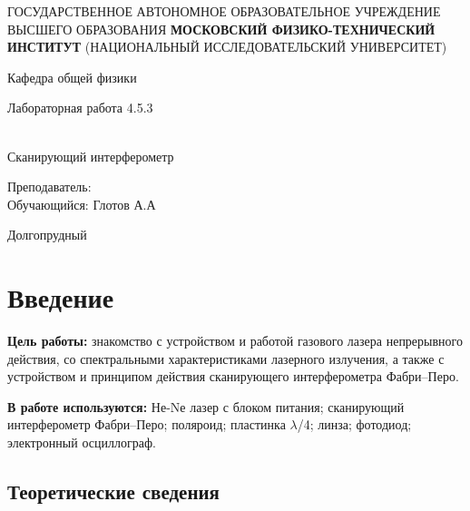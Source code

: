 \documentclass[12pt,a4paper]{article}
\author{Глотов Алексей}
\begin{document}
\newpage
\begin{center}
\footnotesize{{ГОСУДАРСТВЕННОЕ АВТОНОМНОЕ ОБРАЗОВАТЕЛЬНОЕ УЧРЕЖДЕНИЕ}\break
{ВЫСШЕГО ОБРАЗОВАНИЯ}
\break
{\bf {МОСКОВСКИЙ ФИЗИКО-ТЕХНИЧЕСКИЙ ИНСТИТУТ}}
\break
\small{(НАЦИОНАЛЬНЫЙ ИССЛЕДОВАТЕЛЬСКИЙ УНИВЕРСИТЕТ)}}
\break
\hfill \break
\hfill \break
\begin{center}
\normalsize{Кафедра общей физики}
\end{center}
\hfill \break
\hfill \break
\hfill \break
\hfill \break

\begin{center}
\normalsize {Лабораторная работа 4.5.3}
\end{center}
\hfill \break\\
\large{Сканирующий интерферометр}
\end{center}
\begin{flushleft}
\hfill \break
\hfill \break
\hfill \break
\hfill \break
\hfill \break
\hfill \break
\hfill \break
\hfill \break
\hfill \break
\hfill \break
\hangindent=12cm
\normalsize{Преподаватель:}\hfill
\normalsize{}\\
\hfill \break
\normalsize{Обучающийся:}\hfill
\normalsize{Глотов А.А} \\
\hfill \break
\end{flushleft}
\hfill \break
\hfill \break
\hfill \break
\hfill \break
\hfill \break
\hfill \break
\hfill \break
\hfill \break
\hfill \break
\hfill \break
\hfill \break

\begin{center}
Долгопрудный 
\end{center}
\thispagestyle{empty}
\newpage
\section{Введение}


\textbf{Цель работы:} знакомство с устройством и работой газового лазера непрерывного действия, со спектральными характеристиками лазерного излучения, а также с устройством и принципом действия сканирующего интерферометра Фабри–Перо.

\textbf{В работе используются:} Не-Nе лазер с блоком питания; сканирующий интерферометр Фабри–Перо; поляроид; пластинка $\lambda$/4; линза; фотодиод; электронный осциллограф.

\subsection{Теоретические сведения}
\end{document}
